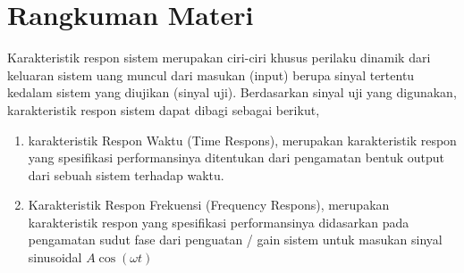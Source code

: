 \documentclass[../laporan]{subfiles}
\begin{document}
\section{Rangkuman Materi}

Karakteristik respon sistem merupakan ciri-ciri khusus perilaku dinamik dari keluaran sistem uang muncul dari masukan (input) berupa sinyal tertentu kedalam sistem yang diujikan (sinyal uji). Berdasarkan sinyal uji yang digunakan, karakteristik respon sistem dapat dibagi sebagai berikut,

\begin{enumerate}
    \item karakteristik Respon Waktu (Time Respons), merupakan karakteristik respon yang spesifikasi performansinya ditentukan dari pengamatan bentuk output dari sebuah sistem terhadap waktu.
    \item Karakteristik Respon Frekuensi (Frequency Respons), merupakan karakteristik respon yang spesifikasi performansinya didasarkan pada pengamatan sudut fase dari penguatan / gain sistem untuk masukan sinyal sinusoidal $A \cos(\omega t)$
\end{enumerate}
\end{document}
